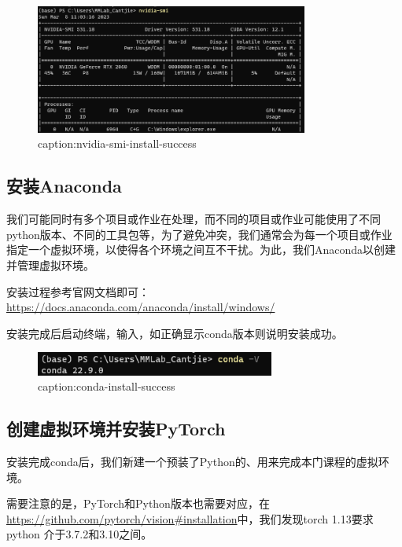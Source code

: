 \begin{figure}[htbp]
	\centering
	\includegraphics[width=0.8\textwidth]{figures/nvidia-smi-install-success.png}
	\caption{caption:nvidia-smi-install-success}
	\label{fig:nvidia-smi-install-success}
\end{figure}

\subsection{安装Anaconda}

我们可能同时有多个项目或作业在处理，而不同的项目或作业可能使用了不同python版本、不同的工具包等，为了避免冲突，我们通常会为每一个项目或作业指定一个虚拟环境，以使得各个环境之间互不干扰。为此，我们Anaconda以创建并管理虚拟环境。

安装过程参考官网文档即可：
\url{https://docs.anaconda.com/anaconda/install/windows/}

安装完成后启动终端，输入，如正确显示conda版本则说明安装成功。
\begin{figure}[htbp]
	\centering
	\includegraphics[width=0.7\textwidth]{figures/conda-install-success.png}
	\caption{caption:conda-install-success}
	\label{fig:conda-install-success}
\end{figure}

\subsection{创建虚拟环境并安装PyTorch} \label{subsec:local-env-create}

安装完成conda后，我们新建一个预装了Python的、用来完成本门课程的虚拟环境。

需要注意的是，PyTorch和Python版本也需要对应，在\url{https://github.com/pytorch/vision#installation}中，我们发现torch 1.13要求python 介于3.7.2和3.10之间。

